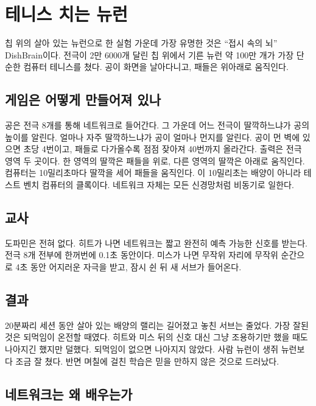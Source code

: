 \chapter{테니스 치는 뉴런}

칩 위의 살아 있는 뉴런으로 한 실험 가운데 가장 유명한 것은 “접시 속의 뇌” DishBrain이다. 전극이 2만 6000개 달린 칩 위에서 기른 뉴런 약 100만 개가 가장 단순한 컴퓨터 테니스를 쳤다. 공이 화면을 날아다니고, 패들은 위아래로 움직인다.

\section*{게임은 어떻게 만들어져 있나}

공은 전극 8개를 통해 네트워크로 들어간다. 그 가운데 어느 전극이 딸깍하느냐가 공의 높이를 알린다. 얼마나 자주 딸깍하느냐가 공이 얼마나 먼지를 알린다. 공이 먼 벽에 있으면 초당 4번이고, 패들로 다가올수록 점점 잦아져 40번까지 올라간다. 출력은 전극 영역 두 곳이다. 한 영역의 딸깍은 패들을 위로, 다른 영역의 딸깍은 아래로 움직인다. 컴퓨터는 10밀리초마다 딸깍을 세어 패들을 움직인다. 이 10밀리초는 배양이 아니라 테스트 벤치 컴퓨터의 클록이다. 네트워크 자체는 모든 신경망처럼 비동기로 일한다.


\section*{교사}

도파민은 전혀 없다. 히트가 나면 네트워크는 짧고 완전히 예측 가능한 신호를 받는다. 전극 8개 전부에 한꺼번에 0.1초 동안이다. 미스가 나면 무작위 자리에 무작위 순간으로 4초 동안 어지러운 자극을 받고, 잠시 쉰 뒤 새 서브가 들어온다.

\section*{결과}

20분짜리 세션 동안 살아 있는 배양의 랠리는 길어졌고 놓친 서브는 줄었다. 가장 잘된 것은 되먹임이 온전할 때였다. 히트와 미스 뒤의 신호 대신 그냥 조용하기만 했을 때도 나아지긴 했지만 덜했다. 되먹임이 없으면 나아지지 않았다. 사람 뉴런이 생쥐 뉴런보다 조금 잘 쳤다. 반면 며칠에 걸친 학습은 믿을 만하지 않은 것으로 드러났다.

\section*{네트워크는 왜 배우는가}

